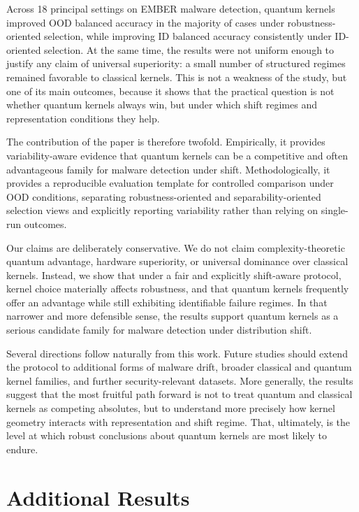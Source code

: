 \documentclass[pdflatex,sn-mathphys-num]{sn-jnl}%
\theoremstyle{thmstyleone}%
\theoremstyle{thmstyletwo}%
\theoremstyle{thmstylethree}%
\begin{document}
Across 18 principal settings on EMBER malware detection, quantum kernels improved OOD balanced accuracy in the majority of cases under robustness-oriented selection, while improving ID balanced accuracy consistently under ID-oriented selection. At the same time, the results were not uniform enough to justify any claim of universal superiority: a small number of structured regimes remained favorable to classical kernels. This is not a weakness of the study, but one of its main outcomes, because it shows that the practical question is not whether quantum kernels always win, but under which shift regimes and representation conditions they help.

The contribution of the paper is therefore twofold. Empirically, it provides variability-aware evidence that quantum kernels can be a competitive and often advantageous family for malware detection under shift. Methodologically, it provides a reproducible evaluation template for controlled comparison under OOD conditions, separating robustness-oriented and separability-oriented selection views and explicitly reporting variability rather than relying on single-run outcomes.

Our claims are deliberately conservative. We do not claim complexity-theoretic quantum advantage, hardware superiority, or universal dominance over classical kernels. Instead, we show that under a fair and explicitly shift-aware protocol, kernel choice materially affects robustness, and that quantum kernels frequently offer an advantage while still exhibiting identifiable failure regimes. In that narrower and more defensible sense, the results support quantum kernels as a serious candidate family for malware detection under distribution shift.

Several directions follow naturally from this work. Future studies should extend the protocol to additional forms of malware drift, broader classical and quantum kernel families, and further security-relevant datasets. More generally, the results suggest that the most fruitful path forward is not to treat quantum and classical kernels as competing absolutes, but to understand more precisely how kernel geometry interacts with representation and shift regime. That, ultimately, is the level at which robust conclusions about quantum kernels are most likely to endure.

\appendix

\section{Additional Results}
\label{app:additional_results}
\end{document}
